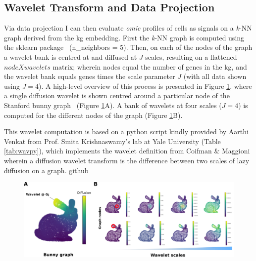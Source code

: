 \subsection{Wavelet Transform and Data Projection}

Via data projection I can then evaluate \emph{omic} profiles of cells as signals on a \emph{k}-NN graph derived from the \acrshort{kg} embedding. First the \emph{k}-NN graph is computed using the sklearn package~\cite{pedregosa_scikit-learn_2011} (n\_neighbors = 5). Then, on each of the nodes of the graph a wavelet bank is centred at and diffused at \(J\) scales, resulting on a flattened \(node X wavelets\) matrix; wherein nodes equal the number of genes in the \acrshort{kg}, and the wavelet bank equals genes times the scale parameter \(J\) (with all data shown using \(J = 4\)). A high-level overview of this process is presented in Figure \ref{fig:2wav}, where a single diffusion wavelet is shown centred around a particular node of the Stanford bunny graph~\cite{turk_zippered_1994} (Figure \ref{fig:2wav}A). A bank of wavelets at four scales (\(J = 4\)) is computed for the different nodes of the graph (Figure \ref{fig:2wav}B). 

This wavelet computation is based on a python script kindly provided by Aarthi Venkat from Prof. Smita Krishnaswamy's lab at Yale University (Table \ref{tab:wavpy}), which implements the wavelet definition from Coifman \& Maggioni~\cite{coifman_diffusion_2006} wherein a diffusion wavelet transform is the difference between two scales of lazy diffusion on a graph.
github

\begin{figure}
    \centering
    \includegraphics{02methods/figs/2KG_wav.png}
    \caption{}
    \label{fig:2wav}
\end{figure}

